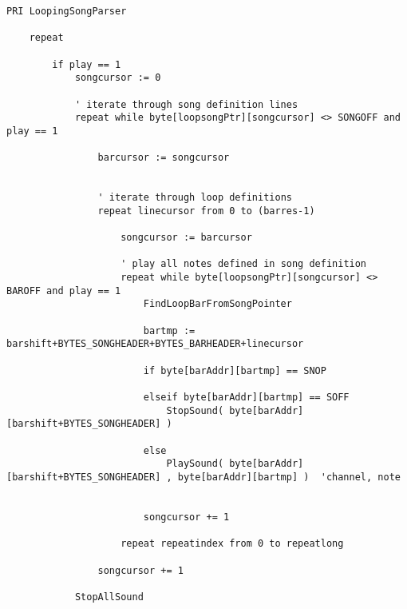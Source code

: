 \lstset{style=spin}
\begin{lstlisting}
PRI LoopingSongParser

    repeat

        if play == 1
            songcursor := 0
               
            ' iterate through song definition lines
            repeat while byte[loopsongPtr][songcursor] <> SONGOFF and play == 1  
                
                barcursor := songcursor
                
                
                ' iterate through loop definitions
                repeat linecursor from 0 to (barres-1)
                
                    songcursor := barcursor

                    ' play all notes defined in song definition
                    repeat while byte[loopsongPtr][songcursor] <> BAROFF and play == 1  
                        FindLoopBarFromSongPointer 
                        
                        bartmp := barshift+BYTES_SONGHEADER+BYTES_BARHEADER+linecursor
                        
                        if byte[barAddr][bartmp] == SNOP

                        elseif byte[barAddr][bartmp] == SOFF
                            StopSound( byte[barAddr][barshift+BYTES_SONGHEADER] )       
                            
                        else
                            PlaySound( byte[barAddr][barshift+BYTES_SONGHEADER] , byte[barAddr][bartmp] )  'channel, note

                            
                        songcursor += 1
                    
                    repeat repeatindex from 0 to repeatlong
                   
                songcursor += 1

            StopAllSound
\end{lstlisting}
